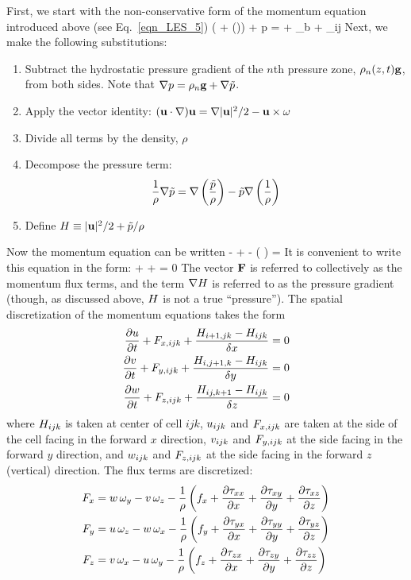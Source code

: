 First, we start with the non-conservative form of the momentum equation introduced above (see Eq.~\ref{eqn_LES_5})
\be \rho \left(  + (\bu \cdot \nabla)\bu  \right) + \nabla p = \rho \bg + \bof_b + \nabla\!\cdot \btau_{ij}  \label{momentum} \ee
Next, we make the following substitutions:
\begin{enumerate}
\item Subtract the hydrostatic pressure gradient of the $n$th pressure zone, $\rho_n(z,t) {\mathbf{g}}$, from both sides. Note that
$\nabla p=\rho_n {\mathbf{g}} + \nabla \tilde{p}$.
\item Apply the vector identity: $({\mathbf{u}} \cdot \nabla) {\mathbf{u}} = \nabla|{\mathbf{u}}|^2/2 - {\mathbf{u}}\times{\mathbf{\omega}} $
\item Divide all terms by the density, $\rho$
\item Decompose the pressure term:
   \[ \frac{1}{\rho} \nabla \tilde{p} = \nabla \left( \frac{\tilde{p}}{\rho}\right) - \tilde{p} \nabla \left(\frac{1}{\rho} \right)  \]
\item Define $H \equiv |{\mathbf{u}}|^2/2 + \tilde{p}/\rho $
\end{enumerate}
Now the momentum equation can be written
\be {} - \bu\times\bo + \nabla \cH - \tp \nabla \left( \right) =    \label{momeq} \ee
It is convenient to write this equation in the form:
\be {} + \bF + \nabla \cH = 0 \label{simple_momentum_equation} \ee
The vector ${\mathbf{F}}$ is referred to collectively as the momentum flux terms, and the term $\nabla H$ is referred to as the
pressure gradient (though, as discussed above, $H$ is not a true ``pressure''). The spatial discretization of the momentum equations takes the form
\begin{align}
\frac{\partial u}{\partial t} + F_{x,ijk} + \frac{H_{i+1,jk} -H_{ijk}}{\delta x} &= 0  \label{umom} \\
\frac{\partial v}{\partial t} + F_{y,ijk} + \frac{H_{i,j+1,k}-H_{ijk}}{\delta y} &= 0  \label{vmom} \\
\frac{\partial w}{\partial t} + F_{z,ijk} + \frac{H_{ij,k+1} -H_{ijk}}{\delta z} &= 0  \label{wmom}
\end{align}
where $H_{ijk}$ is taken at center of cell $ijk$,
$u_{ijk}$ and $F_{x,ijk}$ are taken at the side of the cell facing
in the forward $x$ direction, $v_{ijk}$ and $F_{y,ijk}$ at the side
facing in the forward $y$ direction, and $w_{ijk}$ and $F_{z,ijk}$
at the side facing in the forward $z$ (vertical) direction.
The flux terms are discretized:
\begin{align}
F_x &= w \, \omega_y - v \, \omega_z - \frac{1}{\rho} \left( f_x
  +  \frac{\partial \tau_{xx}}{\partial x} + \frac{\partial \tau_{xy}}{\partial y} + \frac{\partial \tau_{xz}}{\partial z} \right) \\
F_y &= u \, \omega_z - w \, \omega_x - \frac{1}{\rho} \left( f_y
  +  \frac{\partial \tau_{yx}}{\partial x} + \frac{\partial \tau_{yy}}{\partial y} + \frac{\partial \tau_{yz}}{\partial z} \right) \\
F_z &= v \, \omega_x - u \, \omega_y - \frac{1}{\rho} \left( f_z
  +  \frac{\partial \tau_{zx}}{\partial x} + \frac{\partial \tau_{zy}}{\partial y} + \frac{\partial \tau_{zz}}{\partial z} \right)
\end{align}
